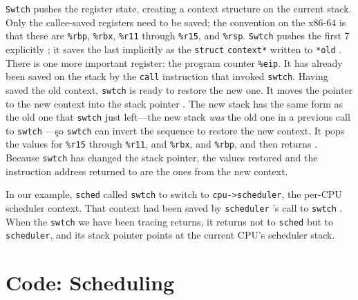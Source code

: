 \lstinline{Swtch}
pushes the register state, creating a context structure
on the current stack.
Only the callee-saved registers need to be saved;
the convention on the x86-64 is that these are
\texttt{\%rbp},
\texttt{\%rbx},
\texttt{\%r11}
through
\texttt{\%r15},
and
\texttt{\%rsp}.
\lstinline{Swtch}
pushes the first 7 explicitly
;
it saves the last implicitly as the
\lstinline{struct}
\lstinline{context*}
written to
\lstinline{*old} 
.
There is one more important register:
the program counter 
\texttt{\%eip}.
It has already been saved on the stack by the
\lstinline{call}
instruction that invoked
\lstinline{swtch}.
Having saved the old context,
\lstinline{swtch}
is ready to restore the new one.
It moves the pointer to the new context
into the stack pointer
.
The new stack has the same form as the old one that
\lstinline{swtch}
just left—the new stack
\textit{was}
the old one in a previous call to
\lstinline{swtch} —\c
so 
\lstinline{swtch}
can invert the sequence to restore the new context.
It pops the values for
\texttt{\%r15}
through
\texttt{\%r11},
and
\texttt{\%rbx},
and
\texttt{\%rbp},
and then returns
.
Because 
\lstinline{swtch}
has changed the stack pointer, the values restored
and the instruction address returned to
are the ones from the new context.

In our example, 
\lstinline{sched}
called
\lstinline{swtch}
to switch to
\lstinline{cpu->scheduler},
the per-CPU scheduler context.
That context had been saved by 
\lstinline{scheduler} 's
call to
\lstinline{swtch}
.
When the
\lstinline{swtch}
we have been tracing returns,
it returns not to
\lstinline{sched}
but to 
\lstinline{scheduler},
and its stack pointer points at the current CPU's
scheduler stack.
\section{Code: Scheduling}

